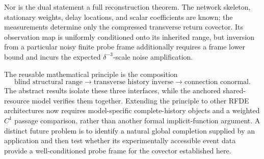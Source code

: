 Nor is the dual statement a full reconstruction theorem.  The network
skeleton, stationary weights, delay locations, and scalar coefficients are
known; the measurements determine only the compressed transverse return
covector.  Its observation map is uniformly conditioned onto its inherited
range, but inversion from a particular noisy finite probe frame additionally
requires a frame lower bound and incurs the expected
\(\delta^{-3}\)-scale noise amplification.

The reusable mathematical principle is the composition
\[
 \text{blind structural range}
 \longrightarrow \text{transverse history inverse}
 \longrightarrow \text{connection conormal}.
\]
The abstract results isolate these three interfaces, while the anchored
shared-resource model verifies them together.  Extending the principle to
other RFDE architectures now requires model-specific complete-history objects
and a weighted \(C^1\) passage comparison, rather than another formal
implicit-function argument.  A distinct future problem is to identify a
natural global completion supplied by an application and then test whether
its experimentally accessible event data provide a well-conditioned probe
frame for the covector established here.
